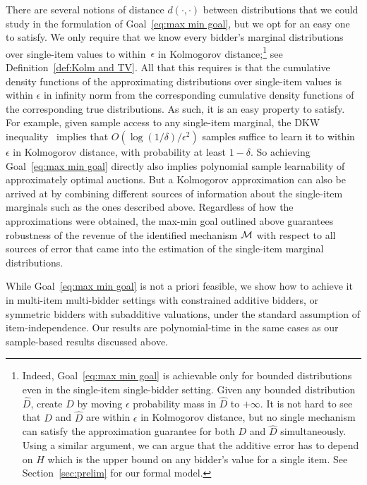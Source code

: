 There are several notions of distance $d(\cdot,\cdot)$ between distributions that we could study in the formulation of Goal~\eqref{eq:max min goal}, but we opt for an easy one to satisfy. We only require that we know every bidder's marginal distributions over single-item values to within~$\epsilon$ in Kolmogorov distance;\footnote{{Indeed, Goal~\eqref{eq:max min goal} is achievable only for bounded distributions even in the single-item single-bidder setting. Given any bounded distribution $\hat{D}$, create $D$ by moving $\epsilon$ probability mass in $\hat{D}$ to $+\infty$. It is not hard to see that $D$ and $\hat{D}$ are within $\epsilon$ in Kolmogorov distance, but no single mechanism can satisfy the approximation guarantee for both $D$ and $\hat{D}$ simultaneously. Using a similar argument, we can argue that the additive error has to depend on $H$ which is the upper bound on any bidder's value for a single item. See Section~\ref{sec:prelim} for our formal model.}} see Definition~\ref{def:Kolm and TV}. All that this requires is that the cumulative density functions of the approximating distributions over single-item values is within $\epsilon$ in infinity norm from the corresponding cumulative density functions of the corresponding true distributions. As such, it is an easy property to satisfy. For example, given sample access to any single-item marginal, the DKW inequality~\cite{DvoretzkyKW56} implies that $O(\log(1/\delta)/\epsilon^2)$ samples suffice to learn it to within $\epsilon$ in Kolmogorov distance, with probability at least $1-\delta$. So achieving Goal~\eqref{eq:max min goal} directly also implies polynomial sample learnability of approximately optimal auctions. But a Kolmogorov approximation can also be arrived at by combining different sources of information about the single-item marginals such as the ones described above. Regardless of how the approximations were obtained, the max-min goal outlined above guarantees robustness of the revenue of the identified mechanism $\cal M$ with respect to all sources of error that came into the estimation of the single-item marginal distributions. 

While Goal~\eqref{eq:max min goal} is not a priori feasible, we show how to achieve it in multi-item multi-bidder settings with constrained additive bidders, or symmetric bidders with subadditive valuations, under the standard assumption of item-independence. Our results are polynomial-time in the same cases as our sample-based results discussed above.



